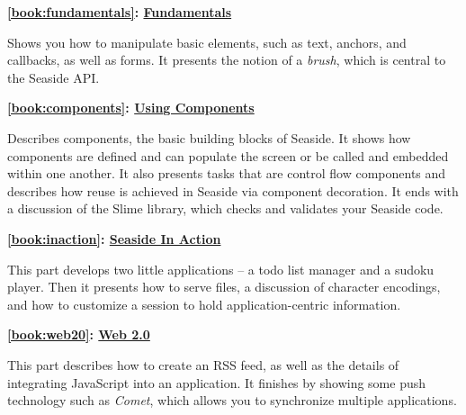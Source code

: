 \documentclass[a4paper,10pt,twoside]{book}
\begin{document}
\begin{list}{}{}
\item\hspace{-\labelwidth}\textbf{ \autoref{book:fundamentals}: \hyperref[book:fundamentals]{Fundamentals}}
\item  Shows you how to manipulate basic elements, such as text, anchors, and callbacks, as well as forms. It presents the notion of a \textit{brush}, which is central to the Seaside API.
\end{list}

\begin{list}{}{}
\item\hspace{-\labelwidth}\textbf{ \autoref{book:components}: \hyperref[book:components]{Using Components}}
\item  Describes components, the basic building blocks of Seaside. It shows how components are defined and can populate the screen or be called and embedded within one another. It also presents tasks that are control flow components and describes how reuse is achieved in Seaside via component decoration. It ends with a discussion of the Slime library, which checks and validates your Seaside code.
\end{list}

\begin{list}{}{}
\item\hspace{-\labelwidth}\textbf{ \autoref{book:inaction}: \hyperref[book:inaction]{Seaside In Action}}
\item  This part develops two little applications -- a todo list manager and a sudoku player. Then it presents how to serve files, a discussion of character encodings, and how to customize a session to hold application-centric information.
\end{list}

\begin{list}{}{}
\item\hspace{-\labelwidth}\textbf{ \autoref{book:web20}: \hyperref[book:web20]{Web 2.0}}
\item  This part describes how to create an RSS feed, as well as the details of integrating JavaScript into an application. It finishes by showing some push technology such as \textit{Comet}, which allows you to synchronize multiple applications.
\end{list}
\end{document}
